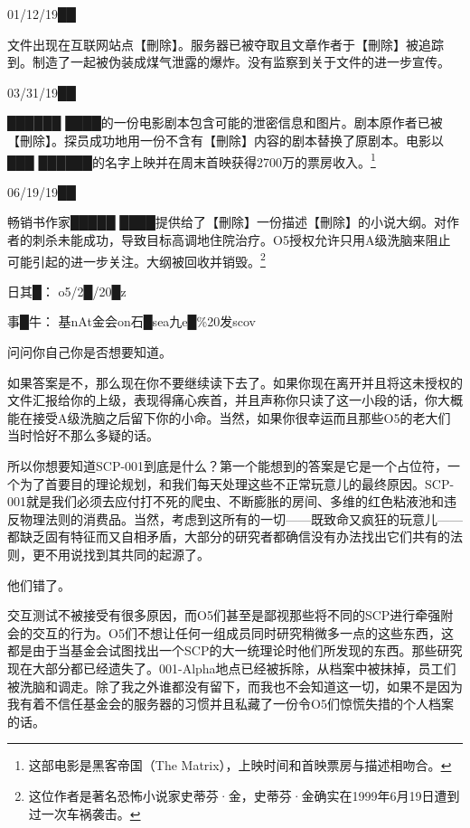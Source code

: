 \begin{scpbox}

01/12/19██

文件出现在互联网站点【刪除】。服务器已被夺取且文章作者于【刪除】被追踪到。制造了一起被伪装成煤气泄露的爆炸。没有监察到关于文件的进一步宣传。

 03/31/19██

██████ ████的一份电影剧本包含可能的泄密信息和图片。剧本原作者已被【刪除】。探员成功地用一份不含有【刪除】内容的剧本替换了原剧本。电影以███ ██████的名字上映并在周末首映获得2700万的票房收入。\footnote{这部电影是黑客帝国（The Matrix），上映时间和首映票房与描述相吻合。}

06/19/19██

畅销书作家█████ ████提供给了【刪除】一份描述【刪除】的小说大纲。对作者的刺杀未能成功，导致目标高调地住院治疗。O5授权允许只用A级洗脑来阻止可能引起的进一步关注。大纲被回收并销毁。\footnote{这位作者是著名恐怖小说家史蒂芬·金，史蒂芬·金确实在1999年6月19日遭到过一次车祸袭击。}

日其█： o5/2█/20█z

事█牛： 基nAt金会on石█sea九e█\%20发scov \\

问问你自己你是否想要知道。

如果答案是不，那么现在你不要继续读下去了。如果你现在离开并且将这未授权的文件汇报给你的上级，表现得痛心疾首，并且声称你只读了这一小段的话，你大概能在接受A级洗脑之后留下你的小命。当然，如果你很幸运而且那些O5的老大们当时恰好不那么多疑的话。

所以你想要知道SCP-001到底是什么？第一个能想到的答案是它是一个占位符，一个为了首要目的理论规划，和我们每天处理这些不正常玩意儿的最终原因。SCP-001就是我们必须去应付打不死的爬虫、不断膨胀的房间、多维的红色粘液池和违反物理法则的消费品。当然，考虑到这所有的一切——既致命又疯狂的玩意儿——都缺乏固有特征而又自相矛盾，大部分的研究者都确信没有办法找出它们共有的法则，更不用说找到其共同的起源了。

他们错了。

交互测试不被接受有很多原因，而O5们甚至是鄙视那些将不同的SCP进行牵强附会的交互的行为。O5们不想让任何一组成员同时研究稍微多一点的这些东西，这都是由于当基金会试图找出一个SCP的大一统理论时他们所发现的东西。那些研究现在大部分都已经遗失了。001-Alpha地点已经被拆除，从档案中被抹掉，员工们被洗脑和调走。除了我之外谁都没有留下，而我也不会知道这一切，如果不是因为我有着不信任基金会的服务器的习惯并且私藏了一份令O5们惊慌失措的个人档案的话。


\end{scpbox}
